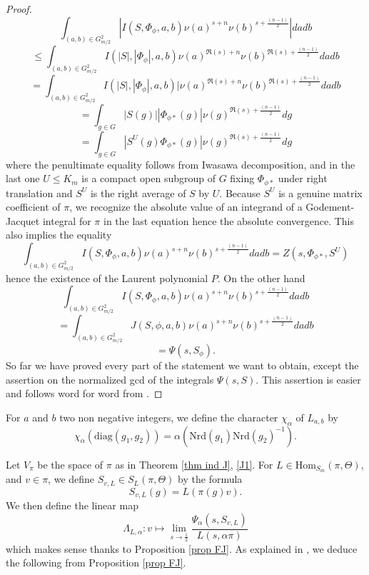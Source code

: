 \documentclass[11pt,letterpaper]{amsart}
\newcommand{\re}{\mathfrak{R}}
\newcommand{\Hom}{\mathrm{Hom}}
\newcommand{\nrd}{{\mathrm{Nrd}}}
\def\diag{\mathrm{diag}}
\theoremstyle{plain}
\numberwithin{equation}{section}
\begin{document}
\begin{proof}
\[\int_{(a,b)\in G_{m/2}^2}|I(S,\Phi_{\phi},a,b)\nu(a)^{s+n}\nu(b)^{s+\frac{(n-1)}{2}}| da db\]
\[\leq 
\int_{(a,b)\in G_{m/2}^2} I(|S|,|\Phi_{\phi}|,a,b) \nu(a)^{\re(s)+n}\nu(b)^{\re(s)+\frac{(n-1)}{2}} da db\]
\[= 
\int_{(a,b)\in G_{m/2}^2}I(|S|,|\Phi_{\phi}|,a,b)|\nu(a)^{\re(s)+n}\nu(b)^{\re(s)+\frac{(n-1)}{2}} da db\]
\[=
\int_{g\in G}|S(g)||\Phi_{\phi*}(g) |\nu(g)^{\re(s)+\frac{(n-1)}{2}} dg\]
\[=\int_{g\in G}|S^U(g) \Phi_{\phi*}(g) |\nu(g)^{\re(s)+\frac{(n-1)}{2}} dg\] 
where the penultimate equality follows from Iwasawa decomposition, and in the last one $U\leq K_m$ is a compact open subgroup of $G$ fixing $\Phi_{\phi*}$ under right translation and $S^U$ is the right average of $S$ by $U$. Because $S^U$ is a genuine matrix coefficient of $\pi$, we recognize the absolute value of an integrand of a Godement-Jacquet integral for $\pi$ in the last equation hence the absolute convergence. This also implies the equality 
\[\int_{(a,b)\in G_{m/2}^2}I(S,\Phi_{\phi},a,b)\nu(a)^{s+n}\nu(b)^{s+\frac{(n-1)}{2}} da db=
Z(s,\Phi_{\phi*},S^U)\] hence the existence of the Laurent polynomial $P$. On the other hand 
\[\int_{(a,b)\in G_{m/2}^2}I(S,\Phi_{\phi},a,b) \nu(a)^{s+n}\nu(b)^{s+\frac{(n-1)}{2}} da db\]
\[=\int_{(a,b)\in G_{m/2}^2}J(S,\phi,a,b) \nu(a)^{s+n}\nu(b)^{s+\frac{(n-1)}{2}} da db\]
\[=\Psi(s,S_{\phi}).\] So far we have proved every part of the statement we want to obtain, except the assertion on the normalized gcd of 
the integrals $\Psi(s,S).$ This assertion is easier and follows word for word from \cite[beginning of p.111 and Lemmas 3.2 and 3.3]{FJ}.
\end{proof}

For $a$ and $b$ two non negative integers, we define the character $\chi_{\alpha}$ of $L_{a,b}$ by 
\[\chi_{\alpha}(\diag(g_1,g_2))=\alpha(\nrd(g_1)\nrd(g_2)^{-1}).\]

Let $V_{\pi}$ be the space of $\pi$ as in Theorem \ref{thm ind J}, \eqref{J1}. For $L\in \Hom_{S_m}(\pi,\Theta)$, and $v\in \pi$, we define 
$S_{v,L}\in S_L(\pi,\Theta)$ by the formula \[S_{v,L}(g)=L(\pi(g)v).\] We then define the linear map 
\[\Lambda_{L,\alpha}:v\mapsto \lim_{s\rightarrow \frac{1}{2}} \frac{\Psi_{\alpha}(s,S_{v,L})}{L(s,\alpha \pi)}\] which makes sense thanks to 
Proposition \ref{prop FJ}. As explained in \cite[p.117]{JR}, we deduce the following from Proposition \ref{prop FJ}.
\end{document}

